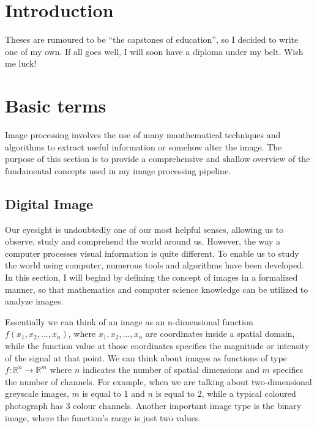 \documentclass[
  digital,     %
  oneside,     %
  nosansbold,  %
  nocolorbold, %
  lof,         %
  lot,         %
]{fithesis4}
\newcommand*{\R}{\ensuremath{\mathbb{R}}}
\begin{document}
\chapter*{Introduction}

Theses are rumoured to be \enquote{the capstones of education}, so
I decided to write one of my own. If all goes well, I will soon
have a diploma under my belt. Wish me luck!

\chapter{Basic terms}
Image processing involves the use of many manthematical techniques and
algorithms to extract useful information or somehow alter the image. The purpose
of this section is to provide a comprehensive and shallow overview of the
fundamental concepts used in my image processing pipeline.

\section{Digital Image}
Our eyesight is undoubtedly one of our most helpful senses, allowing us to
observe, study and comprehend the world around us. However, the way a computer
processes visual information is quite different. To enable us to study the world
using computer, numerous tools and algorithms have been developed. In this
section, I will begind by defining the concept of images in a formalized manner,
so that mathematics and computer science knowledge can be utilized to analyze
images.

Essentially we can think of an image as an n-dimensional function $f(x_1, x_2,
..., x_n)$, where $x_1, x_2, ..., x_n$ are coordinates inside a spatial domain,
while the function value at those coordinates specifies the magnitude or
intensity of the signal at that point. We can think about images as functions of
type $f:\R^n \rightarrow \R^m$ where $n$ indicates the number of spatial
dimensions and $m$ specifies the number of channels. For example, when we are
talking about two-dimensional greyscale images, $m$ is equal to 1 and $n$ is
equal to 2, while a typical coloured photograph has 3 colour channels. Another
important image type is the binary image, where the function's range is just two
values.
\end{document}
